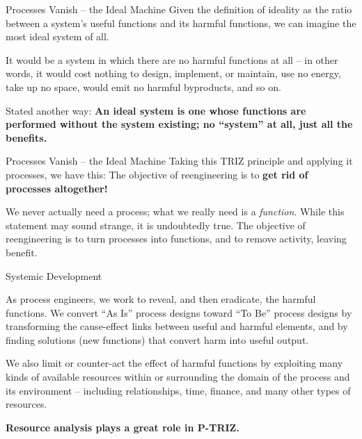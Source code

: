 \documentclass{beamer}
\begin{document}
\begin{frame}{Processes Vanish -- the Ideal Machine}
Given the definition of ideality as the ratio between a system’s useful
functions and its harmful functions, we can imagine the most ideal system of
all.

It would be a system in which there are no harmful functions at all – in other
words, it would cost nothing to design, implement, or maintain, use no energy,
take up no space, would emit no harmful byproducts, and so on.

Stated another way: \textbf{An ideal system is one whose functions are
  performed without the system existing; no “system” at all, just all the
  benefits.}

\end{frame}

\begin{frame}{Processes Vanish -- the Ideal Machine}
Taking this TRIZ principle and applying it processes, we have this: The
objective of reengineering is to \textbf{get rid of processes altogether!}

We never actually need a process; what we really need is a \emph{function}.
While this statement may sound strange, it is undoubtedly true. The objective
of reengineering is to turn processes into functions, and to remove activity,
leaving benefit.
\end{frame}

\begin{frame}{Systemic Development}


As process engineers, we work to reveal, and then eradicate, the harmful
functions. We convert “As Is” process designs toward “To Be” process designs
by transforming the cause-effect links between useful and harmful elements,
and by finding solutions (new functions) that convert harm into useful output.

We also limit or counter-act the effect of harmful functions by exploiting
many kinds of available resources within or surrounding the domain of the
process and its environment – including relationships, time, finance, and many
other types of resources.

\textbf{Resource analysis plays a great role in P-TRIZ.}

\end{frame}
\end{document}
